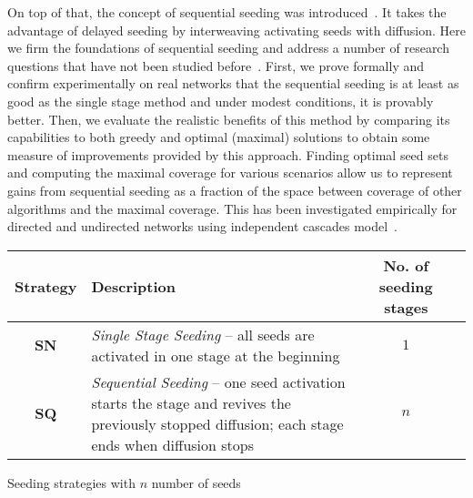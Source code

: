\documentclass[11pt]{article} %
\begin{document}
On top of that, the concept of sequential seeding was introduced~\cite{jankowski2017balancing}. It takes the advantage of delayed seeding by interweaving activating seeds with diffusion. Here we firm the foundations of sequential seeding and address a number of research questions that have not been studied before~\cite{jankowski2017balancing, jankowski2017dynamic, jankowski2017seeds}. First, we prove formally and confirm experimentally on real networks that the sequential seeding is at least as good as the single stage method and under modest conditions, it is provably better. Then, we evaluate the realistic benefits of this method by comparing its capabilities to both greedy and optimal (maximal) solutions to obtain some measure of improvements provided by this approach. Finding optimal seed sets and computing the maximal coverage for various scenarios allow us to represent gains from sequential seeding as a fraction of the space between coverage of other algorithms and the maximal coverage. This has been investigated empirically for directed and undirected networks using independent cascades model~\cite{Kempe:2003}. 

\begin {table*}[!htb]
\begin{center}
\begin{tabular}{ c p{11cm} c c}
\hline

\textbf{Strategy} & \textbf{Description} & \textbf{No. of seeding stages} \\

\hline
\textbf{SN}& \textit{Single Stage Seeding} -- all seeds are activated in one stage at the beginning & $1$  \\ 
\hline
\textbf{SQ} & \textit{Sequential Seeding} -- one seed activation starts the stage and revives the previously stopped diffusion; each stage ends when diffusion stops & $n$  \\ 
\hline
\end{tabular}
\caption {Seeding strategies with $n$  number of seeds}
\label{tab:sq} 
\end{center}
\end {table*}
\end{document}
